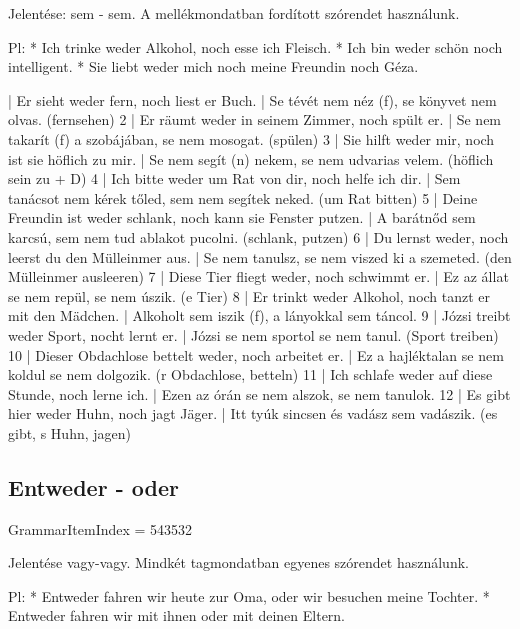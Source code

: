 \documentclass{article}
\newenvironment{desc}{\verbatim}{\endverbatim}
\newenvironment{exmp}{\verbatim}{\endverbatim}
\begin{document}
\begin{desc}
Jelentése: sem - sem.
A mellékmondatban fordított szórendet használunk.

Pl: * Ich trinke weder Alkohol, noch esse ich Fleisch.
* Ich bin weder schön noch intelligent.
* Sie liebt weder mich noch meine Freundin noch Géza.
\end{desc}

\begin{exmp}
1 | Er sieht weder fern, noch liest er Buch. | Se tévét nem néz (f), se könyvet nem olvas. (fernsehen)
2 | Er räumt weder in seinem Zimmer, noch spült er. | Se nem takarít (f) a szobájában, se nem mosogat. (spülen)
3 | Sie hilft weder mir, noch ist sie höflich zu mir. |  Se nem segít (n) nekem, se nem udvarias velem. (höflich sein zu + D)
4 | Ich bitte weder um Rat von dir, noch helfe ich dir. | Sem tanácsot nem kérek tőled, sem nem segítek neked. (um Rat bitten)
5 | Deine Freundin ist weder schlank, noch kann sie Fenster putzen. | A barátnőd sem karcsú, sem nem tud ablakot pucolni. (schlank, putzen)
6 | Du lernst weder, noch leerst du den Mülleinmer aus. | Se nem tanulsz, se nem viszed ki a szemeted. (den Mülleinmer ausleeren)
7 | Diese Tier fliegt weder, noch schwimmt er. | Ez az állat se nem repül, se nem úszik. (e Tier)
8 | Er trinkt weder Alkohol, noch tanzt er mit den Mädchen. | Alkoholt sem iszik (f), a lányokkal sem táncol.
9 | Józsi treibt weder Sport, nocht lernt er. | Józsi se nem sportol se nem tanul. (Sport treiben)
10 | Dieser Obdachlose bettelt weder, noch arbeitet er. | Ez a hajléktalan se nem koldul se nem dolgozik. (r Obdachlose, betteln)
11 | Ich schlafe weder auf diese Stunde, noch lerne ich. | Ezen az órán se nem alszok, se nem tanulok.
12 | Es gibt hier weder Huhn, noch jagt Jäger. | Itt tyúk sincsen és vadász sem vadászik. (es gibt, s Huhn, jagen)
\end{exmp}

\subsection{Entweder - oder}

GrammarItemIndex = 543532

\begin{desc}
Jelentése vagy-vagy.
Mindkét tagmondatban egyenes szórendet használunk.

Pl: * Entweder fahren wir heute zur Oma, oder wir besuchen meine Tochter.
* Entweder fahren wir mit ihnen oder mit deinen Eltern.
\end{desc}
\end{document}
